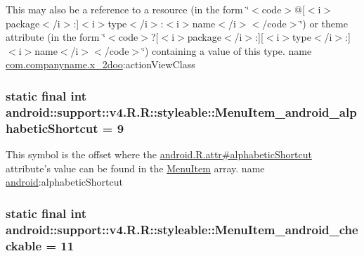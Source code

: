This may also be a reference to a resource (in the form \char`\"{}$<$code$>$@\mbox{[}$<$i$>$package$<$/i$>$:\mbox{]}$<$i$>$type$<$/i$>$:$<$i$>$name$<$/i$>$$<$/code$>$\char`\"{}) or theme attribute (in the form \char`\"{}$<$code$>$?\mbox{[}$<$i$>$package$<$/i$>$:\mbox{]}\mbox{[}$<$i$>$type$<$/i$>$:\mbox{]}$<$i$>$name$<$/i$>$$<$/code$>$\char`\"{}) containing a value of this type.  name \hyperlink{namespacecom_1_1companyname_1_1x__2doo}{com.companyname.x\_\-2doo}:actionViewClass \hypertarget{classandroid_1_1support_1_1v4_1_1_r_1_1styleable_e18b4d4aaf319c1b053a7a2b6e895ec4}{
\subsubsection[{MenuItem\_\-android\_\-alphabeticShortcut}]{\setlength{\rightskip}{0pt plus 5cm}static final int android::support::v4.R.R::styleable::MenuItem\_\-android\_\-alphabeticShortcut = 9}}
\label{classandroid_1_1support_1_1v4_1_1_r_1_1styleable_e18b4d4aaf319c1b053a7a2b6e895ec4}


This symbol is the offset where the \hyperlink{}{android.R.attr\#alphabeticShortcut} attribute's value can be found in the \hyperlink{classandroid_1_1support_1_1v4_1_1_r_1_1styleable_05493a7eeaa2bff09c4fbacbfb671ccc}{MenuItem} array.  name \hyperlink{namespaceandroid}{android}:alphabeticShortcut \hypertarget{classandroid_1_1support_1_1v4_1_1_r_1_1styleable_b68a374916d519737c3a28fed80dc49a}{
\subsubsection[{MenuItem\_\-android\_\-checkable}]{\setlength{\rightskip}{0pt plus 5cm}static final int android::support::v4.R.R::styleable::MenuItem\_\-android\_\-checkable = 11}}
\label{classandroid_1_1support_1_1v4_1_1_r_1_1styleable_b68a374916d519737c3a28fed80dc49a}


